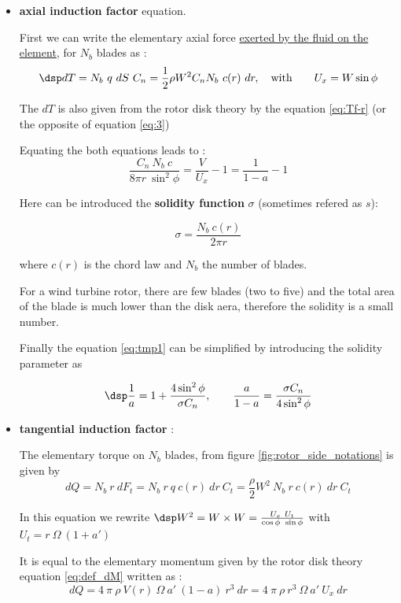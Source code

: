 \begin{itemize}

\item  \textbf{axial induction factor} equation.

First we can write the elementary axial force \underline{exerted by the fluid on the element}, for $N_b$ blades as :
$$ \dsp
dT = N_b~q~dS~C_n = \frac{1}{2} \rho W^2 C_n  N_b~c(r)~dr, \quad {\rm with}\qquad U_x = W \sin\phi 
$$

The  $dT$ is also given from the rotor disk theory by the
equation \eqref{eq:Tf-r} (or the opposite of equation \eqref{eq:3})

Equating the both  equations leads to :
\begin{equation}
\frac{C_n~N_b~c}{8 \pi r ~\sin^2\phi} = \frac{V}{U_x}-1 = \frac{1}{1-a} -1 
\label{eq:tmp1}
\end{equation}


Here can be introduced the
\textbf{solidity function}  $\sigma$ (sometimes refered as $s$): 
    
\begin{equation}
  \sigma = \dfrac{N_b~c(r)}{2\pi r}
\end{equation}

where $c(r)$ is the chord law and $N_b$ the number of blades.

For a wind turbine rotor, there are few blades (two to five) and the total area of the blade
is much lower than the disk aera, therefore the solidity is a small number.


Finally the equation \eqref{eq:tmp1} can be simplified 
by introducing the solidity parameter as  

\begin{equation} \dsp \dfrac{1}{a} = 1+ \dfrac{4 \sin^2\phi}{\sigma C_n}, \qquad   
 \dfrac{a}{1-a} = \dfrac{\sigma C_n}{4 \sin^2\phi}
  \label{eq:a}\end{equation} 

\item  \textbf{tangential induction factor} :


The elementary torque on $N_b$ blades,
 from figure \ref{fig:rotor_side_notations} is given by 
$$
dQ = N_b~r~dF_t = N_b~r~q~c(r)~dr~C_t = \frac{\rho}{2} W^2~N_b~r~c(r)~dr~C_t
$$

In this equation we rewrite 
$\dsp W^2 = W\times W  =  \frac{U_x~U_t}{\cos\phi~\sin\phi}$ with
$U_t = r~\Omega~(1+a')$

It is equal to the elementary momentum given by the rotor disk theory equation
\eqref{eq:def_dM} written as :
$$
dQ =  4 \  \pi \ \rho \ V(r) \ \Omega \  a' \ (1-a)  \ r^3~dr= 4~\pi~\rho~r^3~\Omega~a'~U_x~dr
$$



\end{itemize}
